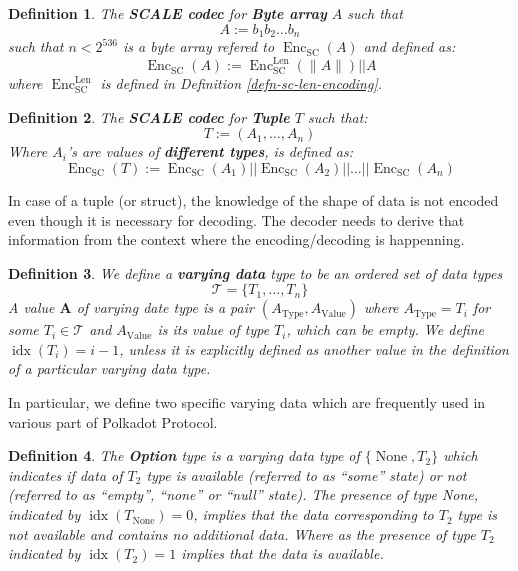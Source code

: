 \documentclass{book}
\newcommand{\assign}{:=}
\newcommand{\tmmathbf}[1]{\ensuremath{\boldsymbol{#1}}}
\newcommand{\tmop}[1]{\ensuremath{\operatorname{#1}}}
\newcommand{\tmstrong}[1]{\textbf{#1}}
\newcommand{\tmtextbf}[1]{{\bfseries{#1}}}
\newtheorem{definition}{Definition}
\providecommand{\tmop}[1]{\ensuremath{\mathrm{#1}}}
\providecommand{\tmstrong}[1]{\tmtextbf{#1}}
\providecommand{\tmtextbf}[1]{\tmtextbf{#1}}
\newtheorem{definition}{Definition}
\begin{document}
\begin{definition}
  \label{defn-scale-byte-array}The {\tmstrong{SCALE codec}} for
  {\tmstrong{Byte array}} $A$ such that
  \[ A \assign b_1 b_2 \ldots b_n \]
  such that $n < 2^{536}$ is a byte array refered to $\tmop{Enc}_{\tmop{SC}}
  (A)$ and defined as:
  \[ \tmop{Enc}_{\tmop{SC}} (A) \assign \tmop{Enc}^{\tmop{Len}}_{\tmop{SC}}
     (\| A \|) | | A \]
  where $\tmop{Enc}_{\tmop{SC}}^{\tmop{Len}}$ is defined in Definition
  \ref{defn-sc-len-encoding}. 
\end{definition}

\begin{definition}
  \label{defn-scale-tuple}The {\tmstrong{SCALE codec}} for {\tmstrong{Tuple}}
  $T$ such that:
  \[ T \assign (A_1, \ldots, A_n) \]
  Where $A_i$'s are values of {\tmstrong{different types}}, is defined as:
  \[ \tmop{Enc}_{\tmop{SC}} (T) \assign \tmop{Enc}_{\tmop{SC}} (A_1) | |
     \tmop{Enc}_{\tmop{SC}} (A_2) | | \ldots | | \tmop{Enc}_{\tmop{SC}} (A_n)
  \]
\end{definition}

In case of a tuple (or struct), the knowledge of the shape of data is not
encoded even though it is necessary for decoding. The decoder needs to derive
that information from the context where the encoding/decoding is happenning.

\begin{definition}
  \label{defn-varrying-data-type}We define a {\tmstrong{varying data}} type to
  be an ordered set of data types
  \[ \mathcal{T}= \{ T_1, \ldots, T_n \} \]
  A value $\tmmathbf{A}$ of varying date type is a pair $(A_{\tmop{Type}},
  A_{\tmop{Value}})$ where $A_{\tmop{Type}} = T_i$ for some $T_i \in
  \mathcal{T}$ and $A_{\tmop{Value}}$ is its value of type $T_i$, which can be
  empty. We define $\tmop{idx} (T_i) = i - 1$, unless it is explicitly defined
  as another value in the definition of a particular varying data type.
\end{definition}

In particular, we define two specific varying data which are frequently used
in various part of Polkadot Protocol.

\begin{definition}
  $\label{defn-option-type}$The {\tmstrong{Option}} type is a varying data
  type of $\{\tmop{None}, T_2 \}$ which indicates if data of $T_2$ type is
  available (referred to as ``some'' state) or not (referred to as ``empty'',
  ``none'' or ``null'' state). The presence of type None, indicated by
  $\tmop{idx} (T_{\tmop{None}}) = 0$, implies that the data corresponding to
  $T_2$ type is not available and contains no additional data. Where as the
  presence of type $T_2$ indicated by $\tmop{idx} (T_2) = 1$ implies that the
  data is available.
\end{definition}
\end{document}
